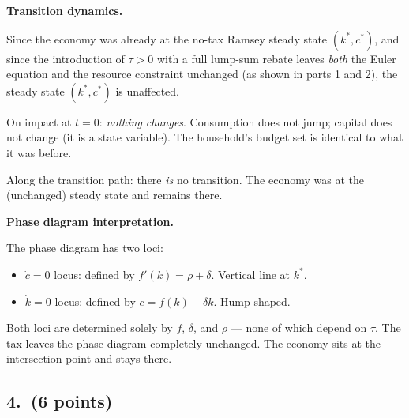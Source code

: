 \documentclass[a4paper,11pt]{article}
\begin{document}
\begin{answerbox}
\textbf{Transition dynamics.}

Since the economy was already at the no-tax Ramsey steady state $(k^*, c^*)$, and since
the introduction of $\tau > 0$ with a full lump-sum rebate leaves \emph{both} the Euler
equation and the resource constraint unchanged (as shown in parts 1 and 2), the steady
state $(k^*, c^*)$ is unaffected.

On impact at $t=0$: \emph{nothing changes}. Consumption does not jump; capital does not
change (it is a state variable). The household's budget set is identical to what it was
before.

Along the transition path: there \emph{is} no transition. The economy was at the
(unchanged) steady state and remains there.

\textbf{Phase diagram interpretation.}

The phase diagram has two loci:
\begin{itemize}[itemsep=2pt]
    \item $\dot{c}=0$ locus: defined by $f'(k) = \rho + \delta$. Vertical line at $k^*$.
    \item $\dot{k}=0$ locus: defined by $c = f(k) - \delta k$. Hump-shaped.
\end{itemize}
Both loci are determined solely by $f$, $\delta$, and $\rho$ --- none of which depend on
$\tau$. The tax leaves the phase diagram completely unchanged. The economy sits at the
intersection point and stays there.
\end{answerbox}

\subsection*{4.\ (6 points)}
\end{document}
